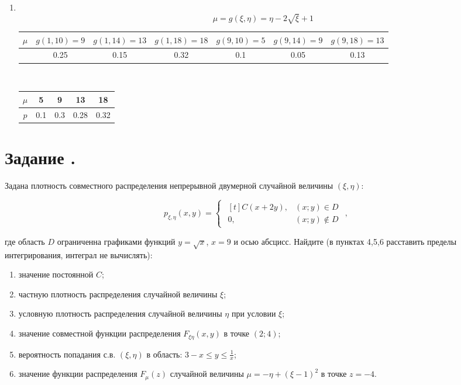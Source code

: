 \documentclass[12pt]{article}
\begin{document}
\begin{enumerate}
	\item \mbox{}\\
	      \[\mu = g(\xi, \eta) = \eta - 2 \sqrt{\xi} + 1\]
	      \begin{tabular}{|c|c|c|c|c|c|c|}
		      \hline
		      $\mu$ & $g(1, 10) = 9$ & $g(1, 14) = 13$ & $g(1, 18) = 18$
		            & $g(9, 10) = 5$ & $g(9, 14) = 9$  & $g(9, 18) = 13$ \\
		      \hline
		            & 0.25           & 0.15            & 0.32
		            & 0.1            & 0.05            & 0.13            \\
		      \hline
	      \end{tabular} \\
	      \begin{tabular}{|c|c|c|c|c|}
		      \hline
		      $\mu$ & 5   & 9   & 13   & 18   \\
		      \hline
		      $p$   & 0.1 & 0.3 & 0.28 & 0.32 \\
		      \hline
	      \end{tabular}
\end{enumerate}

\section*{Задание .}

Задана плотность совместного распределения непрерывной двумерной случайной величины $(\xi,\eta)$:

\begin{equation*}
	p_{\xi,\eta}(x,y) =
	\begin{cases}
		\begin{aligned}[t]
			C(x + 2y), & (x;y) \in D    \\
			0,         & (x;y) \notin D
		\end{aligned}
	\end{cases},
\end{equation*}

где область $D$ ограниченна графиками функций $y = \sqrt{x}$, $x = 9$ и осью абсцисс.
Найдите (в пунктах 4,5,6 расставить пределы интегрирования, интеграл не вычислять):

\begin{enumerate}
	\item значение постоянной $C$;
	\item частную плотность распределения случайной величины $\xi$;
	\item условную плотность распределения случайной величины $\eta$ при условии $\xi$;
	\item значение совместной функции распределения $F_{\xi\eta}(x,y)$ в точке $(2; 4)$;
	\item вероятность попадания с.в. $(\xi, \eta)$ в область: $3 - x \leq y \leq \frac{1}{x}$;
	\item значение функции распределения $F_{\mu}(z)$ случайной величины $\mu = -\eta + (\xi - 1)^2$ в точке $z = -4$.
\end{enumerate}
\end{document}
